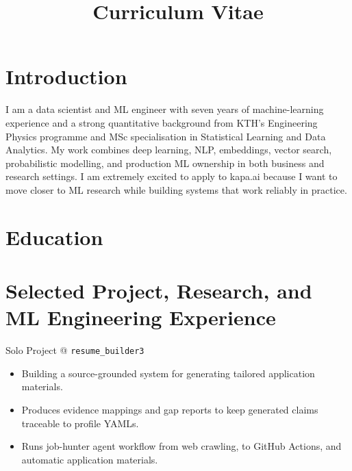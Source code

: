 \documentclass[11pt,a4paper]{moderncv}
\title{Curriculum Vitae}
\begin{document}
\makecvtitle

\section*{Introduction}
I am a data scientist and ML engineer with seven years of machine-learning experience and a strong quantitative background from KTH's Engineering Physics programme and MSc specialisation in Statistical Learning and Data Analytics. My work combines deep learning, NLP, embeddings, vector search, probabilistic modelling, and production ML ownership in both business and research settings. I am extremely excited to apply to kapa.ai because I want to move closer to ML research while building systems that work reliably in practice.

\section{Education}




\section{Selected Project, Research, and ML Engineering Experience}

\large{Solo Project @ \texttt{resume\_builder3}}
\normalsize
\begin{itemize}
    \item Building a source-grounded system for generating tailored application materials.
    \item Produces evidence mappings and gap reports to keep generated claims traceable to profile YAMLs.
    \item Runs job-hunter agent workflow from web crawling, to GitHub Actions, and automatic application materials.
\end{itemize}
\end{document}
